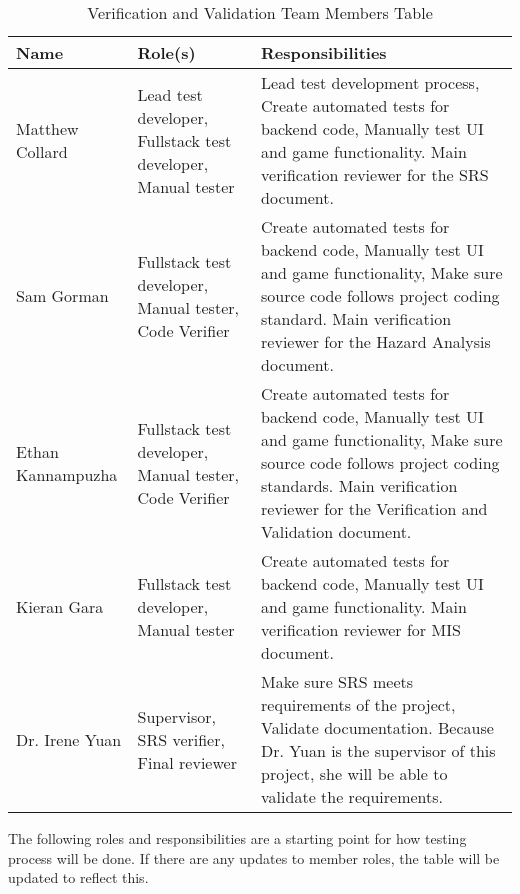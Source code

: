 \documentclass[12pt, titlepage]{article}
\begin{document}
\begin{table}[H]
\caption{Verification and Validation Team Members Table}
\centering
\begin{tabular}{|l|p{1.8in}|p{2.5in}|}
\hline
\textbf{Name}            & \textbf{Role(s)}                                       & \textbf{Responsibilities}                                                                                                                                             \\ \hline
Matthew Collard          & Lead test developer, Fullstack test developer, Manual tester               & Lead test development process, Create automated tests for backend code, Manually test UI and game functionality. Main verification reviewer for the SRS document. \\ \hline
Sam Gorman             & Fullstack test developer, Manual tester, Code Verifier       & Create automated tests for backend code, Manually test UI and game functionality, Make sure source code follows project coding standard. Main verification reviewer for the Hazard Analysis document.                                                            \\ \hline
Ethan Kannampuzha         & Fullstack test developer, Manual tester, Code Verifier                & Create automated tests for backend code, Manually test UI and game functionality, Make sure source code follows project coding standards. Main verification reviewer for the Verification and Validation document.                                                                                               \\ \hline
Kieran Gara            & Fullstack test developer, Manual tester        & Create automated tests for backend code, Manually test UI and game functionality. Main verification reviewer for MIS document.                                            \\ \hline
Dr. Irene Yuan & Supervisor, SRS verifier, Final reviewer &  Make sure SRS meets requirements of the project, Validate documentation. Because Dr. Yuan is the supervisor of this project, she will be able to validate the requirements.\\ \hline
\end{tabular}
\end{table}

The following roles and responsibilities are a starting point for how testing process will be done. If there are any updates to member roles, the table will be updated to reflect this.
\end{document}
